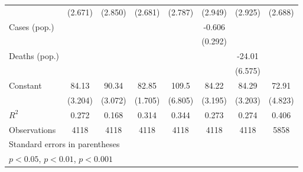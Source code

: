 \documentclass{article}
\begin{document}
{\begin{longtable}{l*{7}{c}}
                &  (2.671)         &  (2.850)         &  (2.681)         &  (2.787)         &  (2.949)         &  (2.925)         &  (2.688)         \\
Cases (pop.)    &                  &                  &                  &                  &   -0.606\sym{*}  &                  &                  \\
                &                  &                  &                  &                  &  (0.292)         &                  &                  \\
Deaths (pop.)   &                  &                  &                  &                  &                  &   -24.01\sym{**} &                  \\
                &                  &                  &                  &                  &                  &  (6.575)         &                  \\
Constant        &    84.13\sym{***}&    90.34\sym{***}&    82.85\sym{***}&    109.5\sym{***}&    84.22\sym{***}&    84.29\sym{***}&    72.91\sym{***}\\
                &  (3.204)         &  (3.072)         &  (1.705)         &  (6.805)         &  (3.195)         &  (3.203)         &  (4.823)         \\
\hline
\(R^{2}\)       &    0.272         &    0.168         &    0.314         &    0.344         &    0.273         &    0.274         &    0.406         \\
Observations    &     4118         &     4118         &     4118         &     4118         &     4118         &     4118         &     5858         \\
\hline\hline
\multicolumn{8}{l}{\footnotesize Standard errors in parentheses}\\
\multicolumn{8}{l}{\footnotesize \sym{*} \(p<0.05\), \sym{**} \(p<0.01\), \sym{***} \(p<0.001\)}\\
\end{longtable}
}
\end{document}
